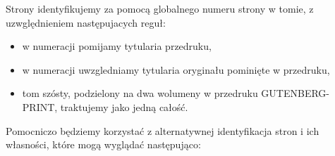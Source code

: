 \documentclass[12]{mwart}
\def\p#1{\textsf{#1}}
\begin{document}
\begin{enumerate}

\end{enumerate}

Strony identyfikujemy za pomocą globalnego numeru strony w tomie, z
uzwględnieniem następujacych reguł:
\begin{itemize}
\item w numeracji pomijamy tytularia przedruku,
\item w numeracji uwzgledniamy tytularia oryginału pominięte w
  przedruku,
\item tom szósty, podzielony na dwa wolumeny w przedruku
  GUTENBERG-PRINT, traktujemy jako jedną całość.
\end{itemize}

Pomocniczo będziemy korzystać z alternatywnej identyfikacja stron i
ich własności, które mogą wyglądać następująco:
\end{document}

